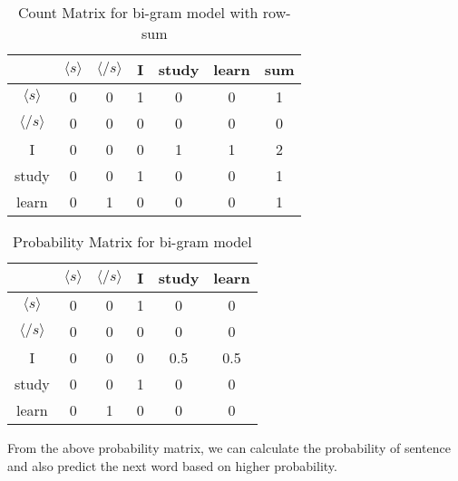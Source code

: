 \begin{table}[H]
	\centering
	\begin{tabular}{|c| c| c| c| c| c| c|}
		\hline
		                     & $\langle s \rangle$ & $\langle /s \rangle$ & I & study & learn & sum \\
		\hline
		$\langle s \rangle$  & 0                   & 0                    & 1 & 0     & 0     & 1   \\
		\hline
		$\langle /s \rangle$ & 0                   & 0                    & 0 & 0     & 0     & 0   \\
		\hline
		I                    & 0                   & 0                    & 0 & 1     & 1     & 2   \\
		\hline
		study                & 0                   & 0                    & 1 & 0     & 0     & 1   \\
		\hline
		learn                & 0                   & 1                    & 0 & 0     & 0     & 1   \\
		\hline
	\end{tabular}
	\caption{Count Matrix for bi-gram model with row-sum}
	\label{tab:cmbi3}
\end{table}
\quad
\begin{table}[H]
	\centering
	\begin{tabular}{|c| c| c| c| c| c|}
		\hline
		                     & $\langle s \rangle$ & $\langle /s \rangle$ & I & study & learn \\
		\hline
		$\langle s \rangle$  & 0                   & 0                    & 1 & 0     & 0     \\
		\hline
		$\langle /s \rangle$ & 0                   & 0                    & 0 & 0     & 0     \\
		\hline
		I                    & 0                   & 0                    & 0 & 0.5   & 0.5   \\
		\hline
		study                & 0                   & 0                    & 1 & 0     & 0     \\
		\hline
		learn                & 0                   & 1                    & 0 & 0     & 0     \\
		\hline
	\end{tabular}
	\caption{Probability Matrix for bi-gram model}
	\label{tab:cmbi1}
\end{table}

From the above probability matrix, we can calculate the probability of sentence and also predict the next word based on higher probability.


